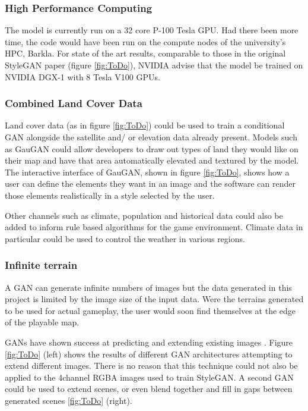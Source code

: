 \documentclass[a4paper]{report}
\begin{document}
\subsubsection{High Performance Computing}
The model is currently run on a 32 core P-100 Tesla GPU. Had there been more time, the code would have been run on the compute nodes of the university's HPC, Barkla. For state of the art results, comparable to those in the original StyleGAN paper (figure \ref{fig:ToDo}), NVIDIA advise that the model be trained on NVIDIA DGX-1 with 8 Tesla V100 GPUs.

\subsubsection{Combined Land Cover Data}
Land cover data (as in figure \ref{fig:ToDo}) could be used to train a conditional GAN alongside the satellite and/ or elevation data already present. Models such as GauGAN \cite{ToDo} could allow developers to draw out types of land they would like on their map and have that area automatically elevated and textured by the model. The interactive interface of GauGAN, shown in figure \ref{fig:ToDo}, shows how a user can define the elements they want in an image and the software can render those elements realistically in a style selected by the user.

Other channels such as climate, population and historical data could also be added to inform rule based algorithms for the game environment. Climate data in particular could be used to control the weather in various regions.

\subsubsection{Infinite terrain}
A GAN can generate infinite numbers of images but the data generated in this project is limited by the image size of the input data. Were the terrains generated to be used for actual gameplay, the user would soon find themselves at the edge of the playable map.

GANs have shown success at predicting and extending existing images \cite{ToDo}. Figure \ref{fig:ToDo} (left) shows the results of different GAN architectures attempting to extend different images. There is no reason that this technique could not also be applied to the 4channel RGBA images used to train StyleGAN. A second GAN could be used to extend scenes, or even blend together and fill in gaps between generated scenes \ref{fig:ToDo} (right).
\end{document}
